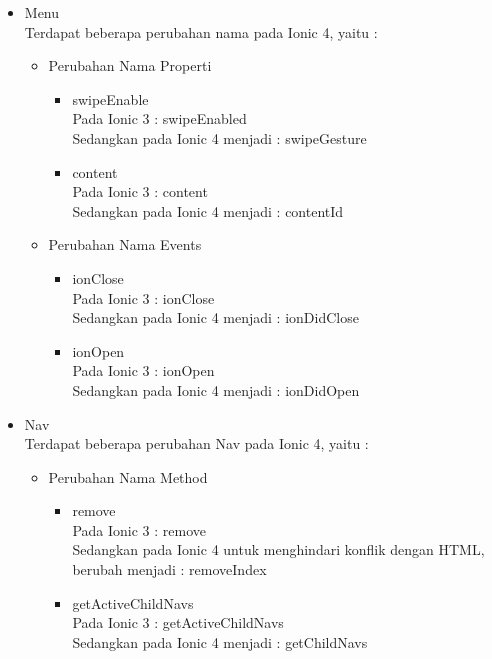 \begin{enumerate}
\begin{enumerate}
\begin{itemize}
\begin{itemize}
				\item Menu \\
				Terdapat beberapa perubahan nama pada Ionic 4, yaitu :
				\begin{itemize}
					\item Perubahan Nama Properti
						\begin{itemize}
							\item swipeEnable \\
							Pada Ionic 3 : swipeEnabled \\
							Sedangkan pada Ionic 4 menjadi : swipeGesture

							\item content \\
							Pada Ionic 3 : content \\
							Sedangkan pada Ionic 4 menjadi : contentId
						\end{itemize}	
					

					\item Perubahan Nama Events
						\begin{itemize}
							\item ionClose \\
							Pada Ionic 3 : ionClose \\
							Sedangkan pada Ionic 4 menjadi : ionDidClose

							\item ionOpen \\
							Pada Ionic 3 : ionOpen \\
							Sedangkan pada Ionic 4 menjadi : ionDidOpen
						\end{itemize}	
				\end{itemize}

\newpage

				\item Nav \\
				Terdapat beberapa perubahan Nav pada Ionic 4, yaitu :
				\begin{itemize}
					\item Perubahan Nama Method 
					\begin{itemize}
						\item remove \\
						Pada Ionic 3 : remove \\
						Sedangkan pada Ionic 4 untuk menghindari konflik dengan HTML, berubah menjadi : removeIndex 

						\item getActiveChildNavs \\
						Pada Ionic 3 : getActiveChildNavs \\
						Sedangkan pada Ionic 4 menjadi : getChildNavs
					\end{itemize}


\end{itemize}
\end{itemize}
\end{itemize}
\end{enumerate}
\end{enumerate}
